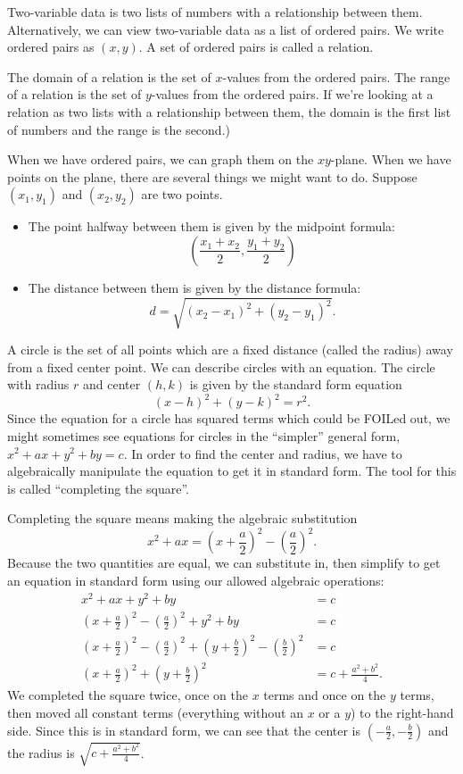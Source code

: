 \documentclass{article}
\begin{document}
Two-variable data is two lists of numbers with a relationship between them. Alternatively, we can view two-variable data as a list of ordered pairs.
We write ordered pairs as $(x,y)$. A set of ordered pairs is called a relation.

The domain of a relation is the set of $x$-values from the ordered pairs. The range of a relation is the set of $y$-values from the ordered pairs. If we're looking at a relation as two lists with a relationship between them, the domain is the first list of numbers and the range is the second.)

When we have ordered pairs, we can graph them on the $xy$-plane. When we have points on the plane, there are several things we might want to do. Suppose $(x_1,y_1)$ and $(x_2,y_2)$ are two points.
\begin{itemize}
    \item The point halfway between them is given by the midpoint formula: \[\left(\frac{x_1+x_2}{2},\frac{y_1+y_2}{2}\right)\] 
    \item The distance between them is given by the distance formula: \[d=\sqrt{(x_2-x_1)^2+(y_2-y_1)^2}.\] 
\end{itemize}

A circle is the set of all points which are a fixed distance (called the radius) away from a fixed center point. We can describe circles with an equation. The circle with radius $r$ and center $(h,k)$ is given by the standard form equation \[(x-h)^2+(y-k)^2=r^2.\] 
Since the equation for a circle has squared terms which could be FOILed out, we might sometimes see equations for circles in the ``simpler'' general form, $x^2+ax+y^2+by=c$. In order to find the center and radius, we have to algebraically manipulate the equation to get it in standard form. The tool for this is called ``completing the square''.

Completing the square means making the algebraic substitution \[x^2+ax=\left(x+\frac{a}{2}\right)^2-\left(\frac{a}{2}\right)^2.\]
Because the two quantities are equal, we can substitute in, then simplify to get an equation in standard form using our allowed algebraic operations:
\begin{align*}
    x^2+ax+y^2+by&=c\\
    \left(x+\frac{a}{2}\right)^2-\left(\frac{a}{2}\right)^2+y^2+by&=c\\
    \left(x+\frac{a}{2}\right)^2-\left(\frac{a}{2}\right)^2+\left(y+\frac{b}{2}\right)^2-\left(\frac{b}{2}\right)^2&=c\\
    \left(x+\frac{a}{2}\right)^2+\left(y+\frac{b}{2}\right)^2&=c+\frac{a^2+b^2}{4}.
\end{align*}
We completed the square twice, once on the $x$ terms and once on the $y$ terms, then moved all constant terms (everything without an $x$ or a $y$) to the right-hand side. Since this is in standard form, we can see that the center is $\left(-\frac{a}{2},-\frac{b}{2}\right)$ and the radius is $\sqrt{c+\frac{a^2+b^2}{4}}$.
\end{document}
